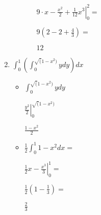 \documentclass[../practica_08.tex]{subfiles}
\begin{document}
\begin{enumerate}
\begin{itemize}
\begin{itemize}
                            $9 \cdot \left. x - \frac{x^2}{2} + \frac{1}{12}x^3 \right |_0^2 = $

                            $ 9(2 - 2 + \frac{4}{3}) = $

                            $ 12 $

                    \end{itemize}

            \end{itemize}
        
        \item $ \int_0^1 (\int_0^{\sqrt(1-x^2)} y dy) dx$
        
            \begin{itemize}
                \item $\int_0^{\sqrt(1-x^2)} y dy$
                
                    $\left. \frac{y^2}{2} \right |_0^{\sqrt(1-x^2)}$

                    $ \frac{1-x^2}{2} $

                \item $ \frac{1}{2}  \int_0^1 1-x^2 dx = $
                
                    $\frac{1}{2} \left. x - \frac{x^3}{3} \right |_0^1 = $

                    $ \frac{1}{2} (1- \frac{1}{3}) =  $

                    $ \frac{2}{3} $

            \end{itemize}

    \end{enumerate}
\end{document}
